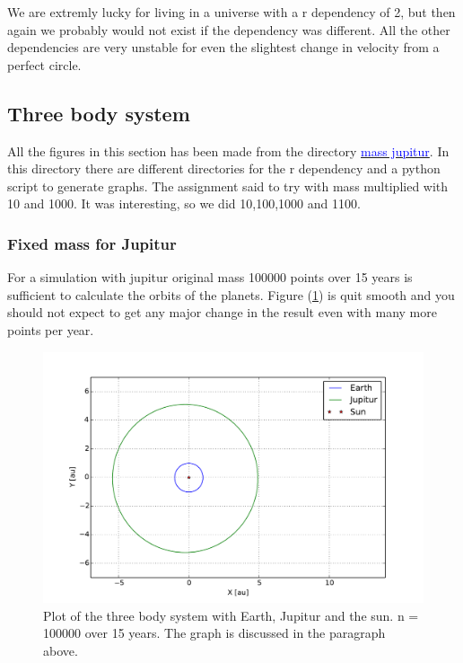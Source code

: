 We are extremly lucky for living in a universe with a r dependency of 2, but then again we probably would not exist if the dependency was different. All the other dependencies are very unstable for even the slightest change in velocity from a perfect circle.


















\subsection{Three body system}

All the figures in this section has been made from the directory \href{https://github.com/erikfsk/Project-3/tree/master/Project3/mass%20jupitur}{\textcolor{blue}{mass jupitur}}. In this directory there are different directories for the r dependency and a python script to generate graphs. The assignment said to try with mass multiplied with 10 and 1000. It was interesting, so we did 10,100,1000 and 1100.

\subsubsection{Fixed mass for Jupitur}

For a simulation with jupitur original mass 100000 points over 15 years is sufficient to calculate the orbits of the planets. Figure (\ref{fig:three-body}) is quit smooth and you should not expect to get any major change in the result even with many more points per year. 

\begin{figure}[H]
    \centering
    \includegraphics[width=\linewidth]{result/bilder/jupitur-mass.pdf}
    \caption{Plot of the three body system with Earth, Jupitur and the sun. n = 100000 over 15 years. The graph is discussed in the paragraph above. }
    \label{fig:three-body}
\end{figure}


